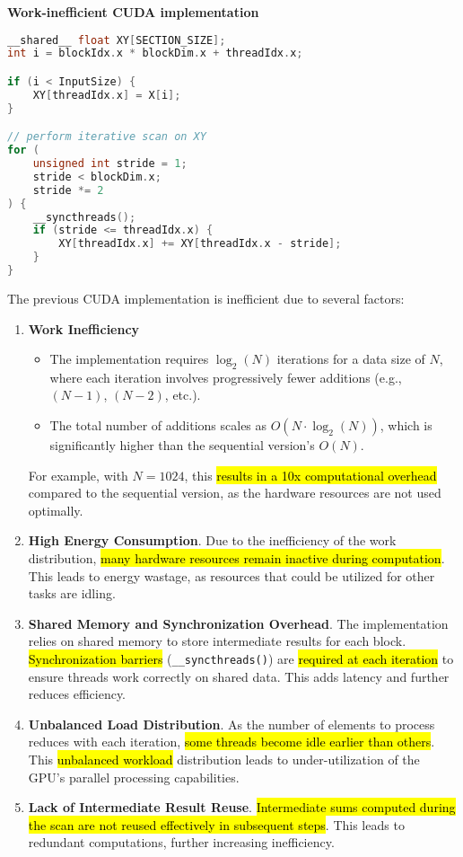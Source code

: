 \highspace
\begin{flushleft}
    \textcolor{Red2}{ \textbf{Work-inefficient CUDA implementation}}
\end{flushleft}
\begin{lstlisting}[language=c++]
__shared__ float XY[SECTION_SIZE];
int i = blockIdx.x * blockDim.x + threadIdx.x;

if (i < InputSize) {
    XY[threadIdx.x] = X[i];
}

// perform iterative scan on XY
for (
    unsigned int stride = 1;
    stride < blockDim.x;
    stride *= 2
) {
    __syncthreads();
    if (stride <= threadIdx.x) {
        XY[threadIdx.x] += XY[threadIdx.x - stride];
    }
}
\end{lstlisting}
The previous CUDA implementation is inefficient due to several factors:
\begin{enumerate}[label=\textcolor{Red2}{\faIcon{times}}]
    \item \textcolor{Red2}{\textbf{Work Inefficiency}}
    \begin{itemize}
        \item The implementation requires $\log_{2}(N)$ iterations for a data size of $N$, where each iteration involves progressively fewer additions (e.g., $(N-1)$, $(N-2)$, etc.).
        \item The total number of additions scales as $O(N \cdot \log_{2}(N))$, which is significantly higher than the sequential version's $O(N)$.
    \end{itemize}
    For example, with $N=1024$, this \hl{results in a 10x computational overhead} compared to the sequential version, as the hardware resources are not used optimally.

    \item \textcolor{Red2}{\textbf{High Energy Consumption}}. Due to the inefficiency of the work distribution, \hl{many hardware resources remain inactive during computation}. This leads to energy wastage, as resources that could be utilized for other tasks are idling.

    \item \textcolor{Red2}{\textbf{Shared Memory and Synchronization Overhead}}. The implementation relies on shared memory to store intermediate results for each block. \hl{Synchronization barriers} (\texttt{\_\_syncthreads()}) are \hl{required at each iteration} to ensure threads work correctly on shared data. This adds latency and further reduces efficiency.

    \item \textcolor{Red2}{\textbf{Unbalanced Load Distribution}}. As the number of elements to process reduces with each iteration, \hl{some threads become idle earlier than others}. This \hl{unbalanced workload} distribution leads to under-utilization of the GPU's parallel processing capabilities.

    \item \textcolor{Red2}{\textbf{Lack of Intermediate Result Reuse}}. \hl{Intermediate sums computed during the scan are not reused effectively in subsequent steps}. This leads to redundant computations, further increasing inefficiency.
\end{enumerate}

